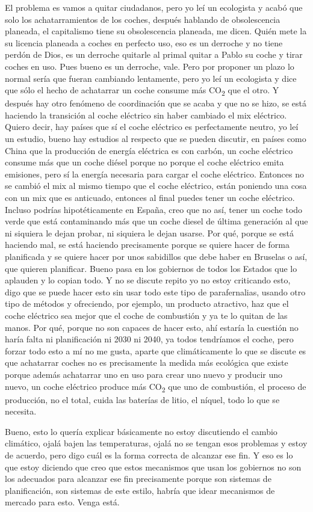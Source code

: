 El problema es vamos a quitar ciudadanos, pero yo leí un ecologista y acabó que solo los achatarramientos de los coches, después hablando de obsolescencia planeada, el capitalismo tiene su obsolescencia planeada, me dicen. Quién mete la su licencia planeada a coches en perfecto uso, eso es un derroche y no tiene perdón de Dios, es un derroche quitarle al primal quitar a Pablo su coche y tirar coches en uso. Pues bueno es un derroche, vale. Pero por proponer un plazo lo normal sería que fueran cambiando lentamente, pero yo leí un ecologista y dice que sólo el hecho de achatarrar un coche consume más CO\textsubscript{2} que el otro. Y después hay otro fenómeno de coordinación que se acaba y que no se hizo, se está haciendo la transición al coche eléctrico sin haber cambiado el mix eléctrico. Quiero decir, hay países que sí el coche eléctrico es perfectamente neutro, yo leí un estudio, bueno hay estudios al respecto que se pueden discutir, en países como China que la producción de energía eléctrica es con carbón, un coche eléctrico consume más que un coche diésel porque no porque el coche eléctrico emita emisiones, pero sí la energía necesaria para cargar el coche eléctrico. Entonces no se cambió el mix al mismo tiempo que el coche eléctrico, están poniendo una cosa con un mix que es anticuado, entonces al final puedes tener un coche eléctrico. Incluso  podrías hipotéticamente en España, creo que no así, tener un coche todo verde que está contaminando más que un coche diesel de última generación al que ni siquiera le dejan probar, ni siquiera le dejan usarse. Por qué, porque se está haciendo mal, se está haciendo precisamente porque se quiere hacer de forma planificada y se quiere hacer por unos sabidillos que debe haber en Bruselas o así, que quieren planificar. Bueno pasa en los gobiernos de todos los Estados que lo aplauden y lo copian todo. Y no se discute repito yo no estoy criticando esto, digo que se puede hacer esto sin usar todo este tipo de parafernalias, usando otro tipo de métodos y ofreciendo, por ejemplo, un producto atractivo, haz que el coche eléctrico sea mejor que el coche de combustión y ya te lo quitan de las manos. Por qué, porque no son capaces de hacer esto, ahí estaría la cuestión no haría falta ni planificación ni 2030 ni 2040, ya todos tendríamos el coche, pero forzar todo esto a mí no me gusta, aparte que climáticamente lo que se discute es que achatarrar coches no es precisamente la medida más ecológica que existe porque además achatarrar uno en uso para crear uno nuevo y producir uno nuevo, un coche eléctrico produce más CO\textsubscript{2} que uno de combustión, el proceso de producción, no el total, cuida las baterías de litio, el níquel, todo lo que se necesita.

Bueno, esto lo quería explicar básicamente no estoy discutiendo el cambio climático, ojalá bajen las temperaturas, ojalá no se tengan esos problemas y estoy de acuerdo, pero digo cuál es la forma correcta de alcanzar ese fin. Y eso es lo que estoy diciendo que creo que estos mecanismos que usan los gobiernos no son los adecuados para alcanzar ese fin precisamente porque son sistemas de planificación, son sistemas de este estilo, habría que idear mecanismos de mercado para esto. Venga está.
